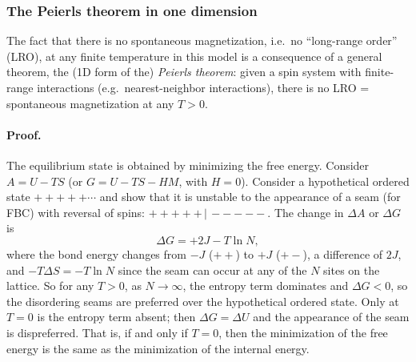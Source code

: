 \begin{diagram}
\end{diagram}

\subsubsection*{The Peierls theorem in one dimension}

The fact that there is no spontaneous magnetization, i.e.\ no ``long-range order'' (LRO), at
any finite temperature in this model is a consequence of a general theorem, the (1D form of
the) \emph{Peierls theorem}: given a spin system with finite-range interactions (e.g.\
nearest-neighbor interactions), there is no LRO = spontaneous magnetization at any $T>0$.

\paragraph{Proof.} The equilibrium state is obtained by minimizing the free energy. Consider
$A = U - TS$ (or $G = U - TS - HM$, with $H = 0$). Consider a hypothetical ordered state
$+++++\cdots$ and show that it is unstable to the appearance of a seam (for FBC) with reversal
of spins: $+++++\,|\,-----$. The change in $\Delta A$ or $\Delta G$ is
\begin{equation}
  \Delta G = +2J - T\ln N,
\end{equation}
where the bond energy changes from $-J$ ($++$) to $+J$ ($+-$), a difference of $2J$, and
$-T\Delta S = -T\ln N$ since the seam can occur at any of the $N$ sites on the lattice. So
for any $T>0$, as $N\to\infty$, the entropy term dominates and $\Delta G<0$, so the disordering
seams are preferred over the hypothetical ordered state. Only at $T = 0$ is the entropy term
absent; then $\Delta G = \Delta U$ and the appearance of the seam is dispreferred. That is,
if and only if $T = 0$, then the minimization of the free energy is the same as the
minimization of the internal energy.

